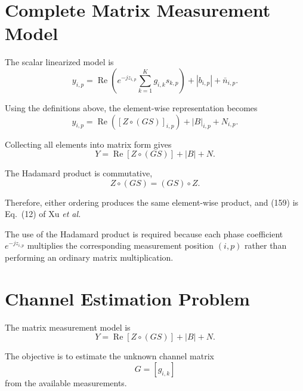 \documentclass[12pt,a4paper]{article}
\begin{document}
\section{Complete Matrix Measurement Model}

The scalar linearized model is
\begin{equation}
y_{i,p}
=
\operatorname{Re}
\left(
e^{-jz_{i,p}}
\sum_{k=1}^{K}
g_{i,k}s_{k,p}
\right)
+
|b_{i,p}|
+
\bar n_{i,p}.
\tag{157}
\end{equation}

Using the definitions above, the element-wise representation becomes
\begin{equation}
y_{i,p}
=
\operatorname{Re}
\left(
[Z\circ(GS)]_{i,p}
\right)
+
|B|_{i,p}
+
N_{i,p}.
\tag{158}
\end{equation}

Collecting all elements into matrix form gives
\begin{equation}
\boxed{
Y
=
\operatorname{Re}[Z\circ(GS)]
+
|B|
+
N
}.
\tag{159}
\end{equation}

The Hadamard product is commutative,
\begin{equation}
Z\circ(GS)
=
(GS)\circ Z.
\tag{160}
\end{equation}

Therefore, either ordering produces the same element-wise product,
and (159) is Eq.~(12) of Xu \emph{et al.}

The use of the Hadamard product is required because each phase
coefficient $e^{-jz_{i,p}}$ multiplies the corresponding measurement
position $(i,p)$ rather than performing an ordinary matrix
multiplication.

\section{Channel Estimation Problem}

The matrix measurement model is
\begin{equation}
Y
=
\operatorname{Re}[Z\circ(GS)]
+
|B|
+
N.
\tag{161}
\end{equation}

The objective is to estimate the unknown channel matrix
\begin{equation}
G=[g_{i,k}]
\tag{162}
\end{equation}
from the available measurements.
\end{document}
